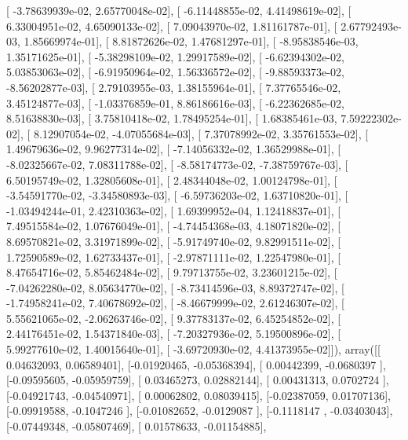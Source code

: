 \documentclass{article}
\begin{document}
       [ -3.78639939e-02,   2.65770048e-02],
       [ -6.11448855e-02,   4.41498619e-02],
       [  6.33004951e-02,   4.65090133e-02],
       [  7.09043970e-02,   1.81161787e-01],
       [  2.67792493e-03,   1.85669974e-01],
       [  8.81872626e-02,   1.47681297e-01],
       [ -8.95838546e-03,   1.35171625e-01],
       [ -5.38298109e-02,   1.29917589e-02],
       [ -6.62394302e-02,   5.03853063e-02],
       [ -6.91950964e-02,   1.56336572e-02],
       [ -9.88593373e-02,  -8.56202877e-03],
       [  2.79103955e-03,   1.38155964e-01],
       [  7.37765546e-02,   3.45124877e-03],
       [ -1.03376859e-01,   8.86186616e-03],
       [ -6.22362685e-02,   8.51638830e-03],
       [  3.75810418e-02,   1.78495254e-01],
       [  1.68385461e-03,   7.59222302e-02],
       [  8.12907054e-02,  -4.07055684e-03],
       [  7.37078992e-02,   3.35761553e-02],
       [  1.49679636e-02,   9.96277314e-02],
       [ -7.14056332e-02,   1.36529988e-01],
       [ -8.02325667e-02,   7.08311788e-02],
       [ -8.58174773e-02,  -7.38759767e-03],
       [  6.50195749e-02,   1.32805608e-01],
       [  2.48344048e-02,   1.00124798e-01],
       [ -3.54591770e-02,  -3.34580893e-03],
       [ -6.59736203e-02,   1.63710820e-01],
       [ -1.03494244e-01,   2.42310363e-02],
       [  1.69399952e-04,   1.12418837e-01],
       [  7.49515584e-02,   1.07676049e-01],
       [ -4.74454368e-03,   4.18071820e-02],
       [  8.69570821e-02,   3.31971899e-02],
       [ -5.91749740e-02,   9.82991511e-02],
       [  1.72590589e-02,   1.62733437e-01],
       [ -2.97871111e-02,   1.22547980e-01],
       [  8.47654716e-02,   5.85462484e-02],
       [  9.79713755e-02,   3.23601215e-02],
       [ -7.04262280e-02,   8.05634770e-02],
       [ -8.73414596e-03,   8.89372747e-02],
       [ -1.74958241e-02,   7.40678692e-02],
       [ -8.46679999e-02,   2.61246307e-02],
       [  5.55621065e-02,  -2.06263746e-02],
       [  9.37783137e-02,   6.45254852e-02],
       [  2.44176451e-02,   1.54371840e-03],
       [ -7.20327936e-02,   5.19500896e-02],
       [  5.99277610e-02,   1.40015640e-01],
       [ -3.69720930e-02,   4.41373955e-02]]), array([[ 0.04632093,  0.06589401],
       [-0.01920465, -0.05368394],
       [ 0.00442399, -0.0680397 ],
       [-0.09595605, -0.05959759],
       [ 0.03465273,  0.02882144],
       [ 0.00431313,  0.0702724 ],
       [-0.04921743, -0.04540971],
       [ 0.00062802,  0.08039415],
       [-0.02387059,  0.01707136],
       [-0.09919588, -0.1047246 ],
       [-0.01082652, -0.0129087 ],
       [-0.1118147 , -0.03403043],
       [-0.07449348, -0.05807469],
       [ 0.01578633, -0.01154885],
\end{document}

